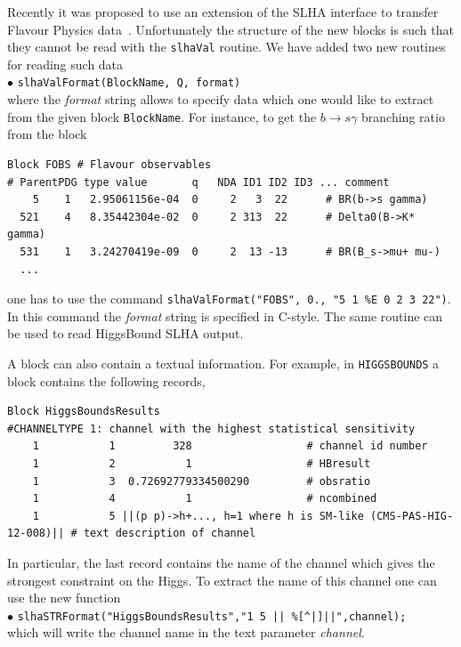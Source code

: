 \documentclass[12pt,a4paper]{article}
\begin{document}
{Recently it was  proposed to use an extension of the SLHA interface
to transfer Flavour Physics data~\cite{Mahmoudi:2010iz}. Unfortunately the structure of the new blocks 
is such that they cannot be read with the {\tt slhaVal} routine. We have added 
two new routines for reading such data\\
\noindent
$\bullet$ \verb|slhaValFormat(BlockName, Q, format)|\\
where the {\it format} string allows to specify data which one would like 
to extract from the given block {\tt BlockName}. For instance, to get the $b\rightarrow s\gamma$ branching ratio 
from the block 
\begin{verbatim}
Block FOBS # Flavour observables
# ParentPDG type value       q   NDA ID1 ID2 ID3 ... comment
    5    1   2.95061156e-04  0     2   3  22      # BR(b->s gamma)
  521    4   8.35442304e-02  0     2 313  22      # Delta0(B->K* gamma)
  531    1   3.24270419e-09  0     2  13 -13      # BR(B_s->mu+ mu-)
  ...
\end{verbatim}
one has to use the command \verb|slhaValFormat("FOBS", 0., "5 1 %E 0 2 3 22")|.
In this command  the {\it format} string is specified in C-style. The same routine can be used 
to read  HiggsBound SLHA output.

 
A block can also contain a textual information. For example, in
{\tt HIGGSBOUNDS} a block  contains the following records, 

{\scriptsize
\begin{verbatim}
Block HiggsBoundsResults 
#CHANNELTYPE 1: channel with the highest statistical sensitivity
    1           1         328                  # channel id number
    1           2           1                  # HBresult
    1           3  0.72692779334500290         # obsratio
    1           4           1                  # ncombined
    1           5 ||(p p)->h+..., h=1 where h is SM-like (CMS-PAS-HIG-12-008)|| # text description of channel
\end{verbatim}
}

\noindent 
In particular, the last record contains  the  name of the channel which gives the strongest constraint on the Higgs.  To extract the name
of this channel one can use the new function\\

\noindent
$\bullet$ \verb!slhaSTRFormat("HiggsBoundsResults","1 5 || %[^|]||",channel);!\\
which will write the channel name  in the text parameter {\it channel}. 

}
\end{document}
